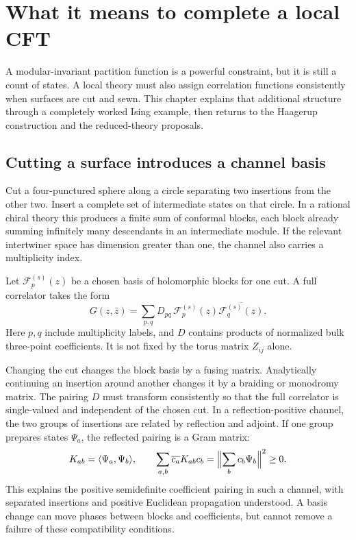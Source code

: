 \chapter{What it means to complete a local CFT}
\label{ch:sewing}

A modular-invariant partition function is a powerful constraint,
but it is still a count of states. A local theory must also assign
correlation functions consistently when surfaces are cut and sewn.
This chapter explains that additional structure through a completely
worked Ising example, then returns to the Haagerup construction and
the reduced-theory proposals.

\section{Cutting a surface introduces a channel basis}

Cut a four-punctured sphere along a circle separating two insertions
from the other two. Insert a complete set of intermediate states
on that circle. In a rational chiral theory this produces a finite
sum of conformal blocks, each block already summing infinitely
many descendants in an intermediate module. If the relevant
intertwiner space has dimension greater than one, the channel
also carries a multiplicity index.

Let $\mathcal F_p^{(s)}(z)$ be a chosen basis of holomorphic
blocks for one cut. A full correlator takes the form
\begin{equation}
 G(z,\bar z)=\sum_{p,q}D_{pq}\,
       \mathcal F_p^{(s)}(z)\overline{\mathcal F_q^{(s)}(z)}.
 \label{eq:sewing-block-pairing}
\end{equation}
Here $p,q$ include multiplicity labels, and $D$ contains products
of normalized bulk three-point coefficients. It is not fixed by
the torus matrix $Z_{ij}$ alone.

Changing the cut changes the block basis by a fusing matrix.
Analytically continuing an insertion around another changes it by
a braiding or monodromy matrix. The pairing $D$ must transform
consistently so that the full correlator is single-valued and
independent of the chosen cut. In a reflection-positive channel,
the two groups of insertions are related by reflection and adjoint.
If one group prepares states $\Psi_a$, the reflected pairing is a
Gram matrix:
\[
 K_{ab}=\langle\Psi_a,\Psi_b\rangle,
 \qquad
 \sum_{a,b}\overline{c_a}K_{ab}c_b
 =\Bigl\|\sum_b c_b\Psi_b\Bigr\|^2\ge0.
\]
This explains the positive semidefinite coefficient pairing in
such a channel, with separated insertions and positive Euclidean
propagation understood. A basis change can move phases between
blocks and coefficients, but cannot remove a failure of these
compatibility conditions.

